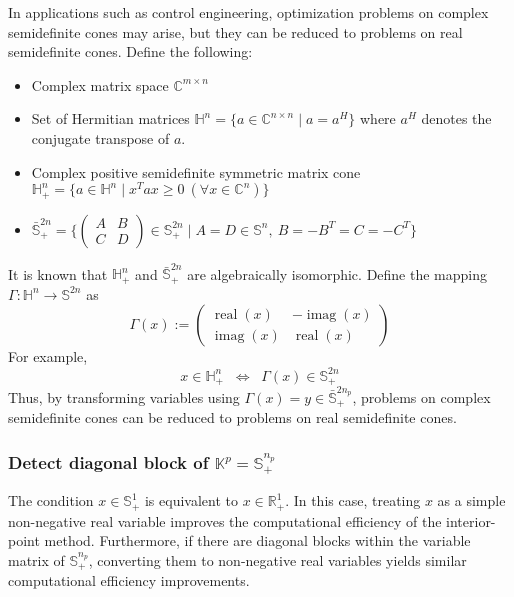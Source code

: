 \documentclass{scrartcl}
\begin{document}
In applications such as control engineering, optimization problems on complex semidefinite cones may arise, but they can be reduced to problems on real semidefinite cones.
Define the following:
\begin{itemize}
    \item Complex matrix space $\mathbb{C}^{m\times n}$
    \item Set of Hermitian matrices $\mathbb{H}^n=\{a \in \mathbb{C}^{n\times n} \mid a = a^H\}$ where $a^H$ denotes the conjugate transpose of $a$.
    \item Complex positive semidefinite symmetric matrix cone $\mathbb{H}^n_+=\{a \in \mathbb{H}^n \mid x^T a x \geq 0 ~(\forall x\in \mathbb{C}^n)\}$
    \item $\bar{\mathbb{S}}^{2n}_+ = \{(\begin{smallmatrix}
    A & B\\
    C & D
\end{smallmatrix}) \in \mathbb{S}^{2n}_+ \mid A=D\in \mathbb{S}^n, ~ B=-B^T=C=-C^T\}$
\end{itemize}
It is known that $\mathbb{H}^n_+$ and $\bar{\mathbb{S}}^{2n}_+$ are algebraically isomorphic.
Define the mapping $\Gamma: \mathbb{H}^n\to \mathbb{S}^{2n}$ as
\[
  \Gamma(x)
  := \begin{pmatrix}
       \operatorname{real}(x) & -\operatorname{imag}(x) \\
       \operatorname{imag}(x) & \operatorname{real}(x)
     \end{pmatrix}
\]
For example,
\[
  x\in \mathbb{H}^n_+
   \;\;\Longleftrightarrow\;\;
  \Gamma(x)\in \mathbb{S}^{2n}_+
\]
Thus, by transforming variables using $\Gamma(x)= y \in \bar{\mathbb{S}}^{2n_p}_+$, problems on complex semidefinite cones can be reduced to problems on real semidefinite cones.

\subsubsection{Detect diagonal block of $\mathbb{K}^p=\mathbb{S}^{n_p}_+$}

The condition $x\in \mathbb{S}^1_+$ is equivalent to $x\in \mathbb{R}^1_+$.
In this case, treating $x$ as a simple non-negative real variable improves the computational efficiency of the interior-point method.
Furthermore, if there are diagonal blocks within the variable matrix of $\mathbb{S}^{n_p}_+$, converting them to non-negative real variables yields similar computational efficiency improvements.
\end{document}

